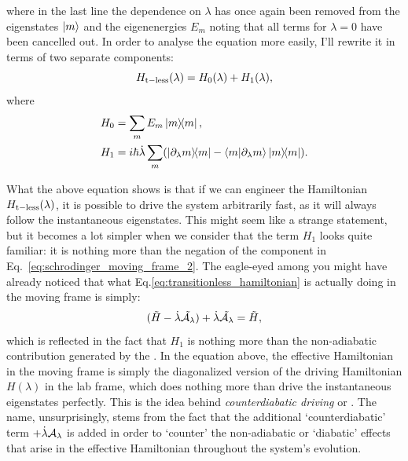     where in the last line the dependence on $\lambda$ has once again been removed from the eigenstates $\ket{m}$ and the eigenenergies $E_m$ noting that all terms for $\lambda = 0$ have been cancelled out. In order to analyse the equation more easily, I'll rewrite it in terms of two separate components:
    \begin{equation}\label{eq:transitionless_h0_h1}
        H_{\rm t-less}(\lambda) = H_0(\lambda) + H_1(\lambda),
    \end{equation}
    where 
    \begin{equation}
        \begin{aligned}
            H_0 &= \sum_m E_m \dyad{m}, \\
            H_1 &= i\hbar \dotlambda \sum_m (\dyad{\dlambda m}{m} - \braket{m}{\dlambda m} \dyad{m}).
        \end{aligned}
    \end{equation}

    What the above equation shows is that if we can engineer the Hamiltonian $H_{\rm t-less} (\lambda)$, it is possible to drive the system arbitrarily fast, as it will always follow the instantaneous eigenstates. This might seem like a strange statement, but it becomes a lot simpler when we consider that the term $H_1$ looks quite familiar: it is nothing more than the negation of the  component in Eq.~\eqref{eq:schrodinger_moving_frame_2}. The eagle-eyed among you might have already noticed that what Eq.\eqref{eq:transitionless_hamiltonian} is actually doing in the moving frame is simply:
    \begin{equation}\label{eq:AGP_cancelling_out}
    	(\Tilde{H} - \dot{\lambda} \Tilde{\mathcal{A}_{\lambda}}) + \dot{\lambda} \Tilde{\mathcal{A}_{\lambda}} = \Tilde{H},
    \end{equation}
    which is reflected in the fact that $H_1$ is nothing more than the non-adiabatic contribution generated by the . In the equation above, the effective Hamiltonian in the moving frame is simply the diagonalized version of the driving Hamiltonian $H(\lambda)$ in the lab frame, which does nothing more than drive the instantaneous eigenstates perfectly. This is the idea behind \emph{counterdiabatic driving} or . The name, unsurprisingly, stems from the fact that the additional `counterdiabatic' term $+ \dot{\lambda}\mathcal{A}_{\lambda}$ is added in order to `counter' the non-adiabatic or `diabatic' effects that arise in the effective Hamiltonian throughout the system's evolution.
    
